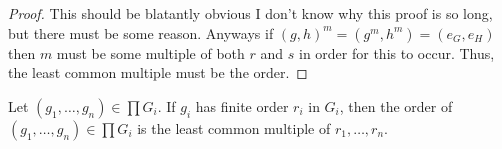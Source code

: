 \documentclass[12pt, letterpaper]{report}
\begin{document}
\begin{proof}
	This should be blatantly obvious I don't know why this proof is so long, but there must be some reason. Anyways if \((g,h)^m = \left( g^m,h^m \right)=(e_G,e_H) \) then \(m\) must be some multiple of both \(r\) and \(s\) in order for this to occur. Thus, the least common multiple must be the order.
\end{proof}
\begin{corollary}
	Let \((g_1,\ldots,g_n)\in \prod G_i\). If \(g_i\) has finite order \(r_i\) in \(G_i\), then the order of \((g_1,\ldots,g_n)\in \prod G_i\) is the least common multiple of \(r_1,\ldots,r_n\).
\end{corollary}
\end{document}
